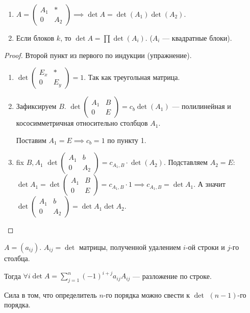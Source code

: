 \begin{theorem}
    \begin{enumerate}
        \item $A = \left( \begin{array}{c|c} A_1 & \ast\\ \hline 0 & A_2\end{array}\right) \implies \det A = \det(A_1)\det(A_2)$.
        \item Если блоков  $k$, то  $\det A = \prod \det(A_i)$. ($A_i$ --- квадратные блоки).
    \end{enumerate}
\end{theorem}
\begin{proof}
    Второй пункт из первого по индукции (упражнение).

    \begin{enumerate}
        \item $\det \left( \begin{array}{c|c} E_x & \ast \\ \hline 0 & E_y \end{array}\right) = 1$. Так как треугольная матрица.
        \item Зафиксируем  $B$.  $\det \left( \begin{array}{c|c} A_1 & B \\ \hline 0 & E\end{array} \right) = c_b \det(A_1)$ --- полилинейная и кососимметричная относительно столбцов  $A_1$.

            Поставим $A_1 = E \implies c_b = 1$ по пункту 1.
        \item fix $B, A_1$  $\det\left(\begin{array}{c|c} A_1 & b \\ \hline 0 & A_2 \end{array} \right) = c_{A_1, B} \cdot \det(A_2)$. Подставляем  $A_2 = E$:  $\det A_1 = \det\left(\begin{array}{c|c} A_1 & B \\ \hline 0 & E \end{array} \right) = c_{A_1, B} \cdot 1 \implies c_{A_1, B} = \det A_1$. А значит $\det\left(\begin{array}{c|c} A_1 & b \\ \hline 0 & A_2 \end{array} \right) = \det A_1 \det A_2$.
    \end{enumerate}
\end{proof}
\begin{theorem}
    $A = (a_{ij})$.  $A_{ij} = \det$ матрицы, полученной удалением  $i$-ой строки и  $j$-го столбца.

    Тогда  $\forall i \det A = \sum\limits_{j=1}^n (-1)^{i+j} a_{ij} A_{ij}$ --- разложение по строке.


    Сила в том, что определитель  $n$-го порядка можно свести к  $\det$  $(n-1)$-го порядка.
\end{theorem}
